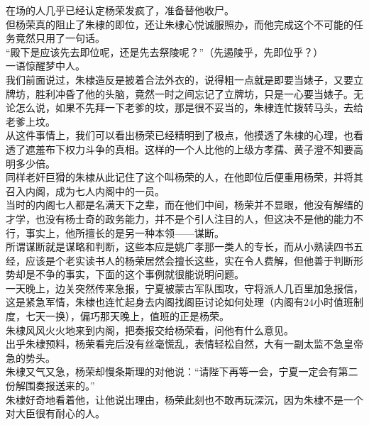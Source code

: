 \begin{multicols}{\theparacolNo}
在场的人几乎已经认定杨荣发疯了，准备替他收尸。\\

但杨荣真的阻止了朱棣的即位，还让朱棣心悦诚服照办，而他完成这个不可能的任务竟然只用了一句话。\\

“殿下是应该先去即位呢，还是先去祭陵呢？”（先遏陵乎，先即位乎？）\\

一语惊醒梦中人。\\

我们前面说过，朱棣造反是披着合法外衣的，说得粗一点就是即要当婊子，又要立牌坊，胜利冲昏了他的头脑，竟然一时之间忘记了立牌坊，只是一心要当婊子。无论怎么说，如果不先拜一下老爹的坟，那是很不妥当的，朱棣连忙拨转马头，去给老爹上坟。\\

从这件事情上，我们可以看出杨荣已经精明到了极点，他摸透了朱棣的心理，也看透了遮羞布下权力斗争的真相。这样的一个人比他的上级方孝孺、黄子澄不知要高明多少倍。\\

同样老奸巨猾的朱棣从此记住了这个叫杨荣的人，在他即位后便重用杨荣，并将其召入内阁，成为七人内阁中的一员。\\

当时的内阁七人都是名满天下之辈，而在他们中间，杨荣并不显眼，他没有解缙的才学，也没有杨士奇的政务能力，并不是个引人注目的人，但这决不是他的能力不行，事实上，他所擅长的是另一种本领——谋断。\\

所谓谋断就是谋略和判断，这些本应是姚广孝那一类人的专长，而从小熟读四书五经，应该是个老实读书人的杨荣居然会擅长这些，实在令人费解，但他善于判断形势却是不争的事实，下面的这个事例就很能说明问题。\\

一天晚上，边关突然传来急报，宁夏被蒙古军队围攻，守将派人几百里加急报信，这是紧急军情，朱棣也连忙起身去内阁找阁臣讨论如何处理（内阁有24小时值班制度，七天一换），偏巧那天晚上，值班的正是杨荣。\\

朱棣风风火火地来到内阁，把奏报交给杨荣看，问他有什么意见。\\

出乎朱棣预料，杨荣看完后没有丝毫慌乱，表情轻松自然，大有一副太监不急皇帝急的势头。\\

朱棣又气又急，杨荣却慢条斯理的对他说：“请陛下再等一会，宁夏一定会有第二份解围奏报送来的。”\\

朱棣好奇地看着他，让他说出理由，杨荣此刻也不敢再玩深沉，因为朱棣不是一个对大臣很有耐心的人。\\


\end{multicols}
